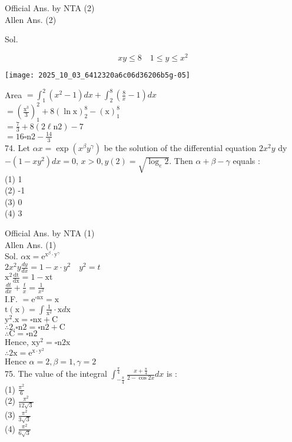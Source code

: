 \documentclass[10pt]{article}
\begin{document}
Official Ans. by NTA (2)\\
Allen Ans. (2)

Sol.

\[
x y \leq 8 \quad 1 \leq y \leq x^{2}
\]

\begin{center}
\texttt{[image: 2025\_10\_03\_6412320a6c06d36206b5g-05]}
\end{center}

Area \(=\int_{1}^{2}\left(x^{2}-1\right) d x+\int_{2}^{8}\left(\frac{8}{x}-1\right) d x\)\\
\(=\left(\frac{\mathrm{x}^{3}}{3}\right)_{1}^{2}+8(\ln \mathrm{x})_{2}^{8}-(\mathrm{x})_{1}^{8}\)\\
\(=\frac{7}{3}+8(2 \ell \mathrm{n} 2)-7\)\\
\(=16 \square \mathrm{n} 2-\frac{14}{3}\)\\
74. Let \(\alpha x=\exp \left(x^{\beta} y^{\gamma}\right)\) be the solution of the differential equation \(2 x^{2} y\) dy \(-\left(1-x y^{2}\right) d x=0\), \(x>0, y(2)=\sqrt{\log _{e} 2}\). Then \(\alpha+\beta-\gamma\) equals :\\
(1) 1\\
(2) -1\\
(3) 0\\
(4) 3

Official Ans. by NTA (1)\\
Allen Ans. (1)\\
Sol. \(\alpha \mathrm{x}=\mathrm{e}^{\mathrm{x}^{\beta} \cdot \mathrm{y}^{\gamma}}\)\\
\(2 x^{2} y \frac{d y}{d x}=1-x \cdot y^{2} \quad y^{2}=t\)\\
\(\mathrm{x}^{2} \frac{\mathrm{dt}}{\mathrm{dx}}=1-\mathrm{xt}\)\\
\(\frac{d t}{d x}+\frac{t}{x}=\frac{1}{x^{2}}\)\\
I.F. \(=\mathrm{e}^{\square \mathrm{nx}}=\mathrm{x}\)\\
\(\mathrm{t}(\mathrm{x})=\int \frac{1}{\mathrm{x}^{2}} \cdot \mathrm{x} d \mathrm{x}\)\\
\(\mathrm{y}^{2} . \mathrm{x}=\square \mathrm{nx}+\mathrm{C}\)\\
\(\therefore 2 . \square \mathrm{n} 2=\square \mathrm{n} 2+\mathrm{C}\)\\
\(\therefore \mathrm{C}=\square \mathrm{n} 2\)\\
Hence, \(\mathrm{xy}^{2}=\square \mathrm{n} 2 \mathrm{x}\)\\
\(\therefore 2 \mathrm{x}=\mathrm{e}^{\mathrm{x} \cdot \mathrm{y}^{2}}\)\\
Hence \(\alpha=2, \beta=1, \gamma=2\)\\
75. The value of the integral \(\int_{-\frac{\pi}{4}}^{\frac{\pi}{4}} \frac{x+\frac{\pi}{4}}{2-\cos 2 x} d x\) is :\\
(1) \(\frac{\pi^{2}}{6}\)\\
(2) \(\frac{\pi^{2}}{12 \sqrt{3}}\)\\
(3) \(\frac{\pi^{2}}{3 \sqrt{3}}\)\\
(4) \(\frac{\pi^{2}}{6 \sqrt{3}}\)
\end{document}
